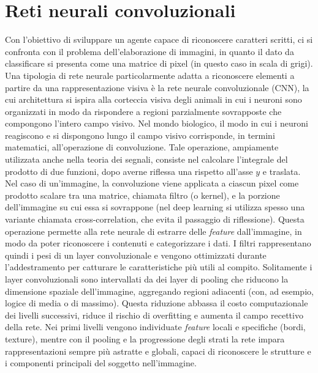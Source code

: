 \documentclass[a4paper,12pt]{article}
\begin{document}
\section{Reti neurali convoluzionali}\label{cnn}
Con l'obiettivo di sviluppare un agente capace di riconoscere caratteri scritti, ci si confronta con il problema dell'elaborazione di immagini, in quanto il dato da classificare si presenta come una matrice di pixel (in questo caso in scala di grigi).
Una tipologia di rete neurale particolarmente adatta a riconoscere elementi a partire da una rappresentazione visiva è la rete neurale convoluzionale (CNN), la cui architettura si ispira alla corteccia visiva degli animali in cui i neuroni sono organizzati in modo da rispondere a regioni parzialmente sovrapposte che compongono l'intero campo visivo.
Nel mondo biologico, il modo in cui i neuroni reagiscono e si dispongono lungo il campo visivo corrisponde, in termini matematici, all'operazione di convoluzione.
Tale operazione, ampiamente utilizzata anche nella teoria dei segnali, consiste nel calcolare l'integrale del prodotto di due funzioni, dopo averne riflessa una rispetto all'asse $y$ e traslata.
Nel caso di un'immagine, la convoluzione viene applicata a ciascun pixel come prodotto scalare tra una matrice, chiamata filtro (o kernel), e la porzione dell'immagine su cui essa si sovrappone (nel deep learning si utilizza spesso una variante chiamata cross-correlation, che evita il passaggio di riflessione).
Questa operazione permette alla rete neurale di estrarre delle \textit{feature} dall'immagine, in modo da poter riconoscere i contenuti e categorizzare i dati.
I filtri rappresentano quindi i pesi di un layer convoluzionale e vengono ottimizzati durante l'addestramento per catturare le caratteristiche più utili al compito.
Solitamente i layer convoluzionali sono intervallati da dei layer di pooling che riducono la dimensione spaziale dell'immagine, aggregando regioni adiacenti (con, ad esempio, logice di media o di massimo). Questa riduzione abbassa il costo computazionale dei livelli successivi, riduce il rischio di overfitting e aumenta il campo recettivo della rete.
Nei primi livelli vengono individuate \textit{feature} locali e specifiche (bordi, texture), mentre con il pooling e la progressione degli strati la rete impara rappresentazioni sempre più astratte e globali, capaci di riconoscere le strutture e i componenti principali del soggetto nell'immagine.
\end{document}
